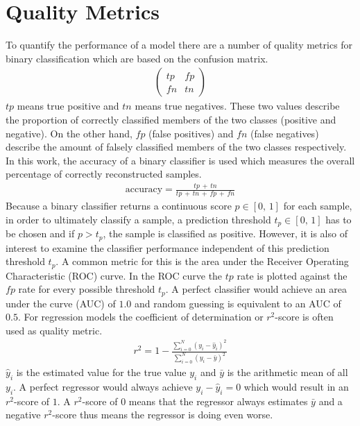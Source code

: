 \section{Quality Metrics}
\label{sec:quality_metrics}
To quantify the performance of a model there are a number of quality metrics for binary classification which are based on the confusion matrix.
\begin{align}
    \begin{pmatrix}
        tp & fp \\
        fn & tn
    \end{pmatrix}
\end{align}
$tp$ means true positive and $tn$ means true negatives. 
These two values describe the proportion of correctly classified members of the two classes (positive and negative).
On the other hand, $fp$ (false positives) and $fn$ (false negatives) describe the amount of falsely classified members of the two classes respectively.
In this work, the accuracy of a binary classifier is used which measures the overall percentage of correctly reconstructed samples.
\begin{align}
    \text{accuracy} = \frac{tp\, +\, tn}{tp\, +\, tn\, +\, fp\, +\, fn}
\end{align}
Because a binary classifier returns a continuous score $p \in [0,\, 1]$ for each sample, in order to ultimately classify a sample,
a prediction threshold $t_p \in [0,\, 1]$ has to be chosen and if $p > t_p$, the sample is classified as positive. 
However, it is also of interest to examine the classifier performance independent of this prediction threshold $t_p$.
A common metric for this is the area under the Receiver Operating Characteristic (ROC) curve.
In the ROC curve the $tp$ rate is plotted against the $fp$ rate for every possible threshold $t_p$.
A perfect classifier would achieve an area under the curve (AUC) of $\num{1.0}$ and random guessing is equivalent to an AUC of $\num{0.5}$.
For regression models the coefficient of determination or $r^2$-score is often used as quality metric.
\begin{align}
    r^2 = 1 - \frac{\sum_{i = 0}^N (y_i - \hat{y}_i)^2}{\sum_{i = 0}^N (y_i - \bar{y})^2}
\end{align}
$\hat{y}_i$ is the estimated value for the true value $y_i$ and $\bar{y}$ is the arithmetic mean of all $y_i$.
A perfect regressor would always achieve $y_i - \hat{y}_i = 0$ which would result in an $r^2$-score of $\num{1}$.
A $r^2$-score of $\num{0}$ means that the regressor always estimates $\bar{y}$ and a negative $r^2$-score thus means the regressor is doing even worse.


